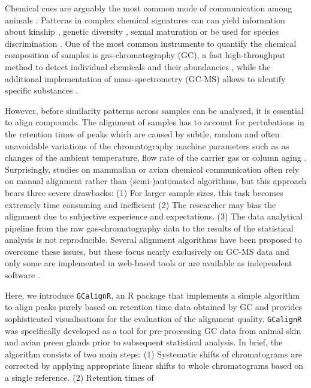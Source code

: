 Chemical cues are arguably the most common mode of communication among
animals \citep{Wyatt.2014}. Patterns in complex chemical signatures can
can yield information about kinship \citep{Krause.2012, Stoffel.2015},
genetic diversity \citep{Charpentier.2010, Leclaire.2012}, sexual
maturation \citep{Caspers.2011} or be used for species discrimination
\citep{Meulemeester.2011}. One of the most common instruments to
quantify the chemical composition of samples is gas-chromatography (GC),
a fast high-throughput method to detect individual chemicals and their
abundancies \citep{McNair.2011}, while the additional implementation of
mass-spectrometry (GC-MS) allows to identify specific substances
\citep{Caspers.2011}. \par
However, before similarity patterns across samples can be analysed, it
is essential to align compounds. The alignment of samples has to account
for pertubations in the retention times of peaks which are caused by
subtle, random and often unavoidable variations of the chromatography
machine parameters such as as changes of the ambient temperature, flow
rate of the carrier gas or column aging \citep{Scott.2003, Pierce.2005}.
Surprisingly, studies on mammalian or avian chemical communication often
rely on manual alignment rather than (semi-)automated algorithms, but
this approach bears three severe drawbacks: (1) For larger sample sizes,
this task becomes extremely time consuming and inefficient (2) The
researcher may bias the alignment due to subjective experience and
expectations. (3) The data analytical pipeline from the raw
gas-chromatography data to the results of the statistical analysis is
not reproducible. Several alignment algorithms have been proposed to
overcome these issues, but these focus nearly exclusively on GC-MS data
\citep{Pierce.2005, Robinson.2007,Jiang.2013} and only some are
implemented in web-based tools \citep{Hoffmann.2009, Wang.2010} or are
available as independent software \citep{Dellicour.2013}. \par
Here, we introduce \texttt{GCalignR}, an R package that implements a
simple algorithm to align peaks purely based on retention time data
obtained by GC and provides sophisticated visualisations for the
evaluation of the alignment quality. \texttt{GCalignR} was specifically
developed as a tool for pre-processing GC data from animal skin and
avian preen glands prior to subsequent statistical analysis. In brief,
the algorithm consists of two main steps: (1) Systematic shifts of
chromatograms are corrected by applying appropriate linear shifts to
whole chromatograms based on a single reference. (2) Retention times of
